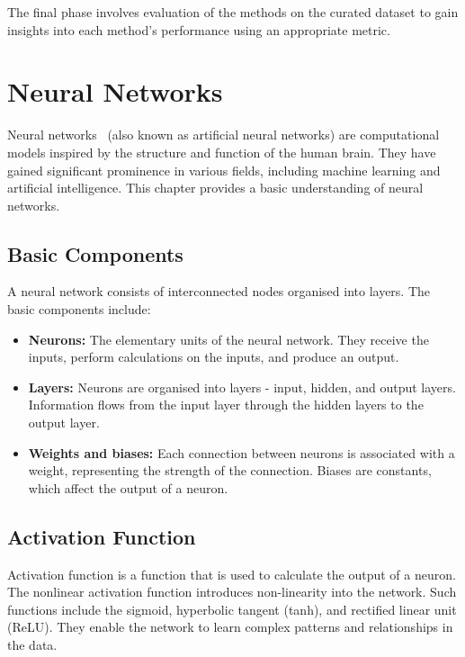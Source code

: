 \documentclass[english, ba, kiv, he, iso690numb, pdf, viewonly]{fasthesis}
\begin{document}
	The final phase involves evaluation of the methods on the curated dataset to gain insights into each method's performance using an appropriate metric.
	
	
	\chapter{Neural Networks}
	Neural networks~\cite{goodfellow2016deep} (also known as artificial neural networks) are computational models inspired by the structure and function of the human brain. They have gained significant prominence in various fields, including machine learning and artificial intelligence. This chapter provides a basic understanding of neural networks.
	
	\section{Basic Components}
	
	A neural network consists of interconnected nodes organised into layers. The basic components include:
	
	\begin{itemize}
		\item \textbf{Neurons:} The elementary units of the neural network. They receive the inputs, perform calculations on the inputs, and produce an output.
		
		\item \textbf{Layers:} Neurons are organised into layers - input, hidden, and output layers. Information flows from the input layer through the hidden layers to the output layer.
		
		\item \textbf{Weights and biases:} Each connection between neurons is associated with a weight, representing the strength of the connection. Biases are constants, which affect the output of a neuron.
	\end{itemize}
	\section{Activation Function}
	
	Activation function is a function that is used to calculate the output of a neuron. The nonlinear activation function introduces non-linearity into the network. Such functions include the sigmoid, hyperbolic tangent (tanh), and rectified linear unit (ReLU). They enable the network to learn complex patterns and relationships in the data.
	
\end{document}
